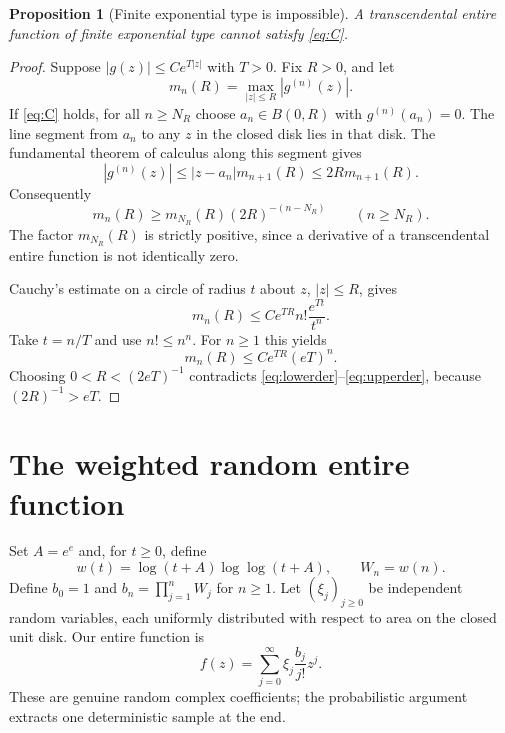 \documentclass[11pt]{article}
\newtheorem{proposition}[theorem]{Proposition}
\theoremstyle{remark}
\begin{document}
\begin{proposition}[Finite exponential type is impossible]
\label{prop:obstruction}
A transcendental entire function of finite exponential type cannot
satisfy \eqref{eq:C}.
\end{proposition}
\begin{proof}
Suppose $|g(z)|\leq C e^{T|z|}$ with $T>0$. Fix $R>0$, and let
\[
 m_n(R)=\max_{|z|\leq R}|g^{(n)}(z)|.
\]
If \eqref{eq:C} holds, for all $n\geq N_R$ choose
$a_n\in B(0,R)$ with $g^{(n)}(a_n)=0$.
The line segment from $a_n$ to any $z$ in the closed disk lies in
that disk. The fundamental theorem of calculus along this segment gives
\[
 |g^{(n)}(z)|\leq |z-a_n|m_{n+1}(R)\leq2R m_{n+1}(R).
\]
Consequently
\begin{equation}\label{eq:lowerder}
 m_n(R)\geq m_{N_R}(R)(2R)^{-(n-N_R)}\qquad(n\geq N_R).
\end{equation}
The factor $m_{N_R}(R)$ is strictly positive, since a derivative
of a transcendental entire function is not identically zero.

Cauchy's estimate on a circle of radius $t$ about $z$, $|z|\leq R$,
gives
\[
 m_n(R)\leq C e^{TR} n!\frac{e^{Tt}}{t^n}.
\]
Take $t=n/T$ and use $n!\leq n^n$. For $n\geq1$ this yields
\begin{equation}\label{eq:upperder}
 m_n(R)\leq C e^{TR}(eT)^n.
\end{equation}
Choosing $0<R<(2eT)^{-1}$ contradicts
\eqref{eq:lowerder}--\eqref{eq:upperder}, because
$(2R)^{-1}>eT$.
\end{proof}

\section{The weighted random entire function}

Set $A=e^e$ and, for $t\geq0$, define
\begin{equation}\label{eq:w}
 w(t)=\log(t+A)\log\log(t+A),\qquad W_n=w(n).
\end{equation}
Define $b_0=1$ and $b_n=\prod_{j=1}^n W_j$ for $n\geq1$.
Let $(\xi_j)_{j\geq0}$ be independent random variables, each uniformly
distributed with respect to area on the closed unit disk.
Our entire function is
\begin{equation}\label{eq:f}
 f(z)=\sum_{j=0}^\infty\xi_j\frac{b_j}{j!}z^j.
\end{equation}
These are genuine random complex coefficients; the probabilistic
argument extracts one deterministic sample at the end.
\end{document}
